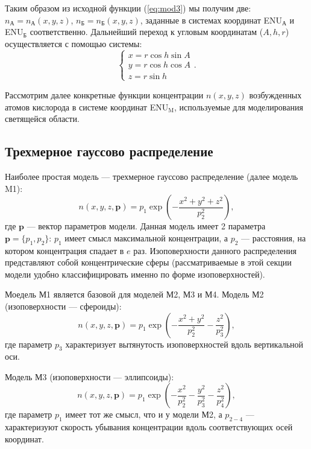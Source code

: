 \documentclass[12pt,a4paper]{article}
\renewcommand{\vec}{\mathbf}
\begin{document}
Таким образом из исходной функции (\ref{eq:mod3}) мы получим две: $n_\text{А}=n_\text{А}(x,y,z)$, $n_\text{Б}=n_\text{Б}(x,y,z)$, заданные в системах координат ENU$_\text{А}$ и ENU$_\text{Б}$ соответственно. Дальнейший переход к угловым координатам ($A,h,r$) осуществляется с помощью системы:
\begin{equation}\label{eq:mod8}
\begin{cases}
x = r\cos{h}\sin{A} \\
y = r\cos{h}\cos{A} \\
z = r\sin{h}
\end{cases}.
\end{equation}

Рассмотрим далее конкретные функции концентрации $n(x,y,z)$ возбужденных атомов кислорода в системе координат ENU$_\text{M}$, используемые для моделирования светящейся области.

\subsection{Трехмерное гауссово распределение} \label{subsec:model1}

Наиболее простая модель --- трехмерное гауссово распределение (далее модель M1):
\begin{equation}\label{eq:gauss1}
n(x,y,z,\vec{p})=p_1 \exp{(-\frac{x^2+y^2+z^2}{p_2^2})},
\end{equation}
где $\vec{p}$ --- вектор параметров модели. Данная модель имеет 2 параметра $\vec{p}=\{p_1,p_2\}$: $p_1$ имеет смысл максимальной концентрации, а $p_2$ --- расстояния, на котором концентрация спадает в $e$ раз. Изоповерхности данного распределения представляют собой концентрические сферы (рассматриваемые в этой секции модели удобно классифицировать именно по форме изоповерхностей). 

Моедель М1 является базовой для моделей М2, М3 и М4. Модель М2 (изоповерхности --- сфероиды):
\begin{equation}\label{eq:gauss2}
	n(x,y,z,\vec{p})=p_1 \exp{(-\frac{x^2+y^2}{p_2^2}-\frac{z^2}{p_3^2})},
\end{equation}
где параметр $p_3$ характеризует вытянутость изоповерхностей вдоль вертикальной оси.

Модель М3 (изоповерхности --- эллипсоиды):
\begin{equation}\label{eq:gauss3}
n(x,y,z,\vec{p})=p_1 \exp{(-\frac{x^2}{p_2^2}-\frac{y^2}{p_3^2}-\frac{z^2}{p_4^2})},
\end{equation}
где параметр $p_{1}$ имеет тот же смысл, что и у модели М2, а $p_{2-4}$ --- 
характеризуют скорость убывания концентрации вдоль соответствующих осей координат.
\end{document}
